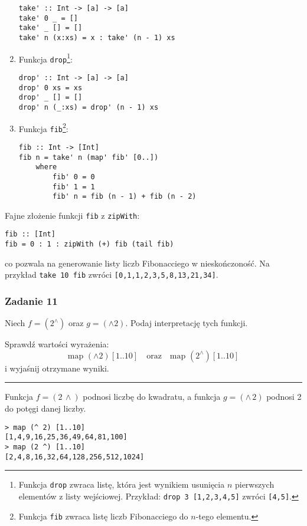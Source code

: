 \documentclass[11pt,a4paper]{article}
\begin{document}
\begin{enumerate}
\begin{Verbatim}[frame=single]
take' :: Int -> [a] -> [a]
take' 0 _ = []
take' _ [] = []
take' n (x:xs) = x : take' (n - 1) xs
        \end{Verbatim}
    \item Funkcja \texttt{drop}\footnote{Funkcja \texttt{drop} zwraca listę, która jest wynikiem usunięcia \( n \) pierwszych elementów z listy wejściowej. \newline
        Przykład: \texttt{drop 3 [1,2,3,4,5]} zwróci \texttt{[4,5]}.}:
        \begin{Verbatim}[frame=single]
drop' :: Int -> [a] -> [a]
drop' 0 xs = xs
drop' _ [] = []
drop' n (_:xs) = drop' (n - 1) xs
        \end{Verbatim}
    \item Funkcja \texttt{fib}\footnote{Funkcja \texttt{fib} zwraca listę liczb Fibonacciego do \( n \)-tego elementu.}:
        \begin{Verbatim}[frame=single]
fib :: Int -> [Int]
fib n = take' n (map' fib' [0..])
    where
        fib' 0 = 0
        fib' 1 = 1
        fib' n = fib (n - 1) + fib (n - 2)
        \end{Verbatim}
\end{enumerate}
Fajne złożenie funkcji \texttt{fib} z \texttt{zipWith}:
\begin{Verbatim}[frame=single]
fib :: [Int]
fib = 0 : 1 : zipWith (+) fib (tail fib)
\end{Verbatim}
co pozwala na generowanie listy liczb Fibonacciego w nieskończoność.
Na przykład \texttt{take 10 fib} zwróci \texttt{[0,1,1,2,3,5,8,13,21,34]}.

\subsubsection{Zadanie 11}
Niech \( f = (2^{\wedge}) \) oraz \( g = (\wedge 2) \). Podaj interpretację tych funkcji.

Sprawdź wartości wyrażenia:
\[
\text{map } (\wedge 2) [1..10] \quad \text{oraz} \quad \text{map } (2^{\wedge}) [1..10]
\]
i wyjaśnij otrzymane wyniki.

\bigskip
\hrule
\bigskip

Funkcja \( f = (2 \, \wedge) \) podnosi liczbę do kwadratu, a funkcja \( g = (\wedge \, 2) \) podnosi 2 do potęgi danej liczby.
\begin{Verbatim}[frame=single]
> map (^ 2) [1..10]
[1,4,9,16,25,36,49,64,81,100]
> map (2 ^) [1..10]
[2,4,8,16,32,64,128,256,512,1024]
\end{Verbatim}
\end{document}
